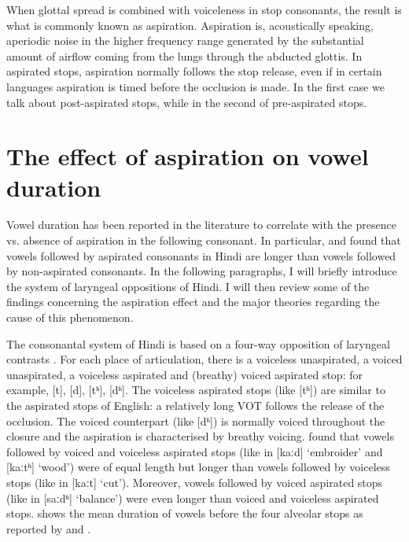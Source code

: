 \documentclass[11pt,a4paper,openany]{memoir}\usepackage[]{graphicx}\usepackage[]{color}
\begin{document}
When glottal spread is combined with voiceleness in stop consonants, the result is what is commonly known as aspiration.
Aspiration is, acoustically speaking, aperiodic noise in the higher frequency range generated by the substantial amount of airflow coming from the lungs through the abducted glottis.
In aspirated stops, aspiration normally follows the stop release, even if in certain languages aspiration is timed before the occlusion is made.
In the first case we talk about post-aspirated stops, while in the second of pre-aspirated stops.


\section{The effect of aspiration on vowel duration}
\label{s:aspiration}

Vowel duration has been reported in the literature to correlate with the presence vs. absence of aspiration in the following consonant.
In particular, \citet{maddieson1976} and \citet{durvasula2012} found that vowels followed by aspirated consonants in Hindi are longer than vowels followed by non-aspirated consonants.
In the following paragraphs, I will briefly introduce the system of laryngeal oppositions of Hindi.
I will then review some of the findings concerning the aspiration effect and the major theories regarding the cause of this phenomenon.

The consonantal system of Hindi is based on a four-way opposition of laryngeal contrasts \citep{ohala1983}.
For each place of articulation, there is a voiceless unaspirated, a voiced unaspirated, a voiceless aspirated and (breathy) voiced aspirated stop: for example, [t], [d], [tʰ], [dʱ].
The voiceless aspirated stops (like [tʰ]) are similar to the aspirated stops of English: a relatively long VOT follows the release of the occlusion.
The voiced counterpart (like [dʱ]) is normally voiced throughout the closure and the aspiration is characterised by breathy voicing.
\citet{maddieson1976} found that vowels followed by voiced and voiceless aspirated stops (like in [kaːd] `embroider' and [kaːtʰ] `wood') were of equal length but longer than vowels followed by voiceless stops (like in [kaːt] `cut').
Moreover, vowels followed by voiced aspirated stops (like in [saːdʱ] `balance') were even longer than voiced and voiceless aspirated stops.
 shows the mean duration of vowels before the four alveolar stops as reported by \citet{maddieson1976} and \citet{lampp2004}.

\end{document}

